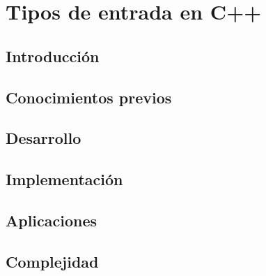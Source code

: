 \chapter{Tipos de entrada en C++}
\section{Introducción}

\section{Conocimientos previos}

\section{Desarrollo}

\section{Implementación}

\section{Aplicaciones}

\section{Complejidad}

%